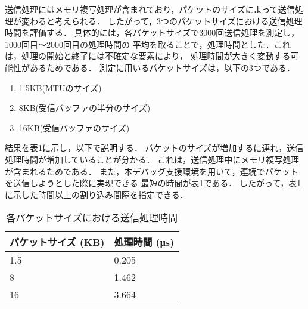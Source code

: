 \documentclass[submit,techreq,noauthor,dvipdfmx]{ipsj}
\begin{document}
送信処理にはメモリ複写処理が含まれており，パケットのサイズによって送信処理が変わると考えられる．
したがって，3つのパケットサイズにおける送信処理時間を評価する．
具体的には，各パケットサイズで3000回送信処理を測定し，1000回目〜2000回目の処理時間の
平均を取ることで，処理時間とした．これは，処理の開始と終了には不確定な要素により，
処理時間が大きく変動する可能性があるためである．
測定に用いるパケットサイズは，以下の3つである．
\begin{enumerate}
    \item 1.5KB(MTUのサイズ)
    \item 8KB(受信バッファの半分のサイズ)
    \item 16KB(受信バッファのサイズ)
\end{enumerate}

結果を表\ref{tx-time}に示し，以下で説明する．
パケットのサイズが増加するに連れ，送信処理時間が増加していることが分かる．
これは，送信処理中にメモリ複写処理が含まれるためである．
また，本デバッグ支援環境を用いて，連続でパケットを送信しようとした際に実現できる
最短の時間が表\ref{tx-time}である．
したがって，表\ref{tx-time}に示した時間以上の割り込み間隔を指定できる．


\begin{table}[h]
    \caption{各パケットサイズにおける送信処理時間}
    \label{tx-time}
    \begin{center}
        \begin{tabular}{l|l}   \hline \hline 
            パケットサイズ (KB)      & 処理時間 (μs)    \\ \hline
            1.5                      & 0.205            \\
            8                        & 1.462            \\
            16                       & 3.664            \\ \hline
        \end{tabular}
    \end{center}
\end{table}
\end{document}
